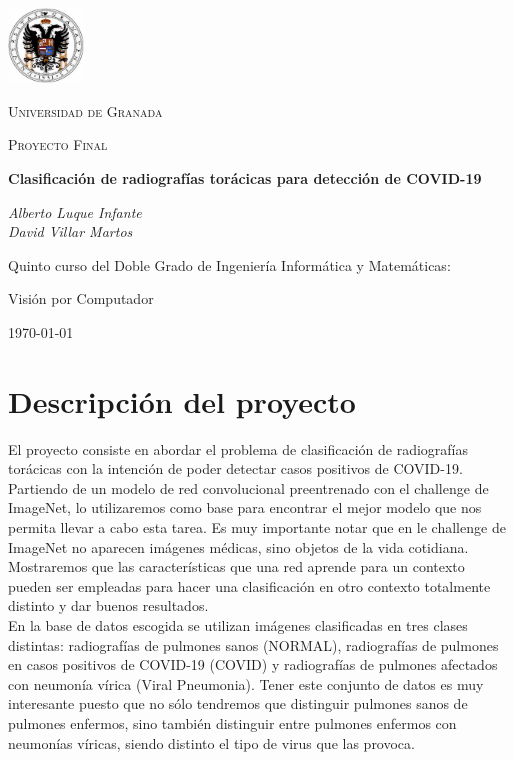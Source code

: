 \documentclass[11pt,a4paper]{article}
\theoremstyle{definition}
\begin{document}
\begin{titlepage}
  \centering
 \includegraphics[width=0.15\textwidth]{./images/exp.jpg}\par\vspace{1cm}
  {\scshape\LARGE Universidad de Granada  \par}
  \vspace{1cm}
  {\scshape Proyecto Final\par}
  \vspace{1.5cm}
  {\huge\bfseries  Clasificación de radiografías torácicas para detección de COVID-19\par}
  \vspace{2cm}
  {\Large\itshape Alberto Luque Infante\\David Villar Martos\par}
  \vfill
  Quinto curso del Doble Grado de Ingeniería Informática y Matemáticas:\par
  Visión por Computador

  \vfill

  {\large \today\par}
\end{titlepage}

\tableofcontents
\newpage
\section{Descripción del proyecto}

El proyecto consiste en abordar el problema de clasificación de radiografías torácicas con la intención de poder detectar casos positivos de COVID-19.\\

Partiendo de un modelo de red convolucional preentrenado con el challenge de  ImageNet, lo utilizaremos como base para encontrar el mejor modelo que nos permita llevar a cabo esta tarea. Es muy importante notar que en le challenge de ImageNet no aparecen imágenes médicas, sino objetos de la vida cotidiana. Mostraremos que las características que una red aprende para un contexto pueden ser empleadas para hacer una clasificación en otro contexto totalmente distinto y dar buenos resultados. \\

En la base de datos escogida se utilizan imágenes clasificadas en tres clases distintas: radiografías de pulmones sanos (NORMAL), radiografías de pulmones en casos positivos de COVID-19 (COVID) y radiografías de pulmones afectados con neumonía vírica (Viral Pneumonia). Tener este conjunto de datos es muy interesante puesto que no sólo tendremos que distinguir pulmones sanos de pulmones enfermos, sino también distinguir entre pulmones enfermos con neumonías víricas,  siendo distinto el tipo de virus que las provoca.\\
\end{document}
